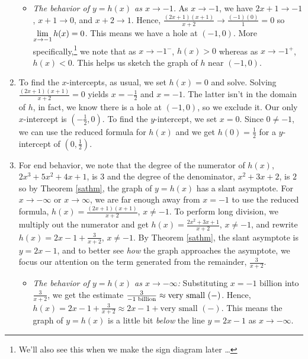 \documentclass{ximera}
\begin{document}
\begin{ex}
\begin{enumerate}
\begin{itemize}
\item  \textit{The behavior of $y=h(x)$ as $x \rightarrow -1$.}    As $x \rightarrow -1$, we have $2x+1 \rightarrow -1$, $x+1 \rightarrow 0$, and $x+2 \rightarrow 1$.  Hence, $\frac{(2x+1)(x+1)}{x+2} \rightarrow \frac{(-1)(0)}{1} = 0$ so $\ds{\lim_{x \rightarrow -1} h(x) = 0}$.  This means we have a hole at $(-1,0)$.  More specifically,\footnote{We'll also see this  when we make the sign diagram later \ldots} we note that as $x \rightarrow -1^{-}$,  $h(x) > 0$ whereas as $x \rightarrow -1^{+}$, $h(x) < 0$. This helps us sketch the graph of $h$ near $(-1,0)$.

\end{itemize}


\item  To find the $x$-intercepts, as usual, we set $h(x) = 0$ and solve.  Solving $\frac{(2x+1)(x+1)}{x+2}=0$ yields $x=-\frac{1}{2}$ and $x=-1$.  The latter isn't in the domain of $h$, in fact, we know there is a hole at $(-1,0)$,  so we exclude it.  Our only $x$-intercept is $\left(-\frac{1}{2}, 0\right)$.  To find the $y$-intercept, we set $x=0$.  Since $0 \neq -1$, we can use the reduced formula for $h(x)$ and we get $h(0) = \frac{1}{2}$ for a $y$-intercept of $\left(0,\frac{1}{2}\right)$.


\item  For end behavior, we note that the degree of the numerator of $h(x)$, $2x^3+5x^2+4x+1$, is $3$ and the degree of the denominator, $x^2+3x+2$, is $2$ so by Theorem \ref{sathm}, the graph of $y = h(x)$ has a slant asymptote.  For $x\rightarrow  -\infty$ or $x \rightarrow \infty$, we are far enough away from $x=-1$ to use the reduced formula, $h(x) = \frac{(2x+1)(x+1)}{x+2}$, $x \neq -1$.  To perform long division, we multiply out the numerator and get $h(x) = \frac{2x^2+3x+1}{x+2}$, $x \neq -1$, and rewrite $h(x) = 2x-1+\frac{3}{x+2}$, $x \neq -1$.  By Theorem \ref{sathm}, the slant asymptote is $y = 2x-1$, and to better see \textit{how} the graph approaches the asymptote, we focus our attention on the term generated from the remainder, $\frac{3}{x+2}$.

\begin{itemize}

\item  \textit{The behavior of $y=h(x)$ as $x \rightarrow -\infty$:} Substituting  $x = \text{$-1$ billion}$ into $\frac{3}{x+2}$, we get the estimate $\frac{3}{\text{\scriptsize $-1$ billion}} \approx \text{very small $(-)$}$.  Hence, $h(x) = 2x-1+\frac{3}{x+2} \approx 2x-1 + \text{very small $(-)$}$.  This means the graph of $y=h(x)$ is a little bit \textit{below} the line $y=2x-1$ as $x \rightarrow -\infty$.


\end{itemize}
\end{enumerate}
\end{ex}
\end{document}
